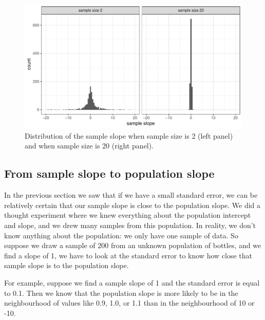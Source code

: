\documentclass[]{book}\usepackage[]{graphicx}\usepackage[]{color}
\makeatletter
\def\maxwidth{ %
  \ifdim\Gin@nat@width>\linewidth
    \linewidth
  \else
    \Gin@nat@width
  \fi
}
\newenvironment{knitrout}{}{} %
\makeatother
\begin{document}
\begin{knitrout}
\color{fgcolor}\begin{figure}

{\centering \includegraphics[width=\maxwidth]{figure/inf_7-1} 

}

\caption[Distribution of the sample slope when sample size is 2 (left panel) and when sample size is 20 (right panel)]{Distribution of the sample slope when sample size is 2 (left panel) and when sample size is 20 (right panel).}\label{fig:inf_7}
\end{figure}


\end{knitrout}


\subsection{From sample slope to population slope}

In the previous section we saw that if we have a small standard error, we can be relatively certain that our sample slope is close to the population slope. We did a thought experiment where we knew everything about the population intercept and slope, and we drew many samples from this population. In reality, we don't know anything about the population: we only have one sample of data. So suppose we draw a sample of 200 from an unknown population of bottles, and we find a slope of 1, we have to look at the standard error to know how close that sample slope is to the population slope.

For example, suppose we find a sample slope of 1 and the standard error is equal to 0.1. Then we know that the population slope is more likely to be in the neighbourhood of values like 0.9, 1.0, or 1.1 than in the neighbourhood of 10 or -10.
\end{document}
